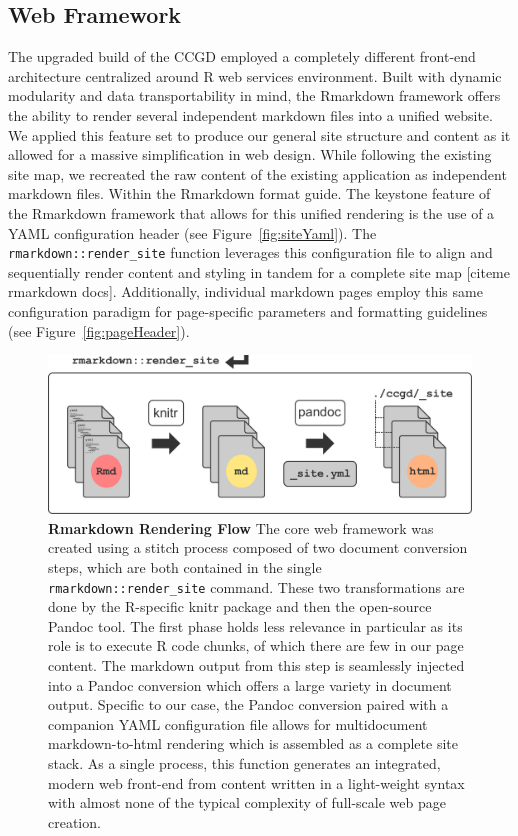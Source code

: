 \documentclass[10pt]{report}
\begin{document}
\subsection{Web Framework}
The upgraded build of the CCGD employed a completely different front-end architecture centralized around R web services environment. Built with dynamic modularity and data transportability in mind, the Rmarkdown framework offers the ability to render several independent markdown files into a unified website. We applied this feature set to produce our general site structure and content as it allowed for a massive simplification in web design. While following the existing site map, we recreated the raw content of the existing application as independent markdown files. Within the Rmarkdown format guide. The keystone feature of the Rmarkdown framework that allows for this unified rendering is the use of a YAML configuration header (see Figure~\ref{fig:siteYaml}). The \texttt{rmarkdown::render\_site} function leverages this configuration file to align and sequentially render content and styling in tandem for a complete site map [citeme rmarkdown docs]. Additionally, individual markdown pages employ this same configuration paradigm for page-specific parameters and formatting guidelines (see Figure~\ref{fig:pageHeader}).

\begin{figure}[H]
    \includegraphics[width=\linewidth]{fig/rmarkdown_flow.pdf}
    \caption[Rmarkdown Rendering Flow]{\textbf{Rmarkdown Rendering Flow} The core web framework was created using a stitch process composed of two document conversion steps, which are both contained in the single \texttt{rmarkdown::render\_site} command. These two transformations are done by the R-specific knitr package and then the open-source Pandoc tool. The first phase holds less relevance in particular as its role is to execute R code chunks, of which there are few in our page content. The markdown output from this step is seamlessly injected into a Pandoc conversion which offers a large variety in document output. Specific to our case, the Pandoc conversion paired with a companion YAML configuration file allows for multidocument markdown-to-html rendering which is assembled as a complete site stack. As a single process, this function generates an integrated, modern web front-end from content written in a light-weight syntax with almost none of the typical complexity of full-scale web page creation.}\label{fig:renderFlow}
\end{figure}
\end{document}

